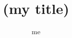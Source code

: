 \documentclass{myclass}
\title{(my title)}
\author{me}
\begin{document}
\blinddocument 
\end{document}
